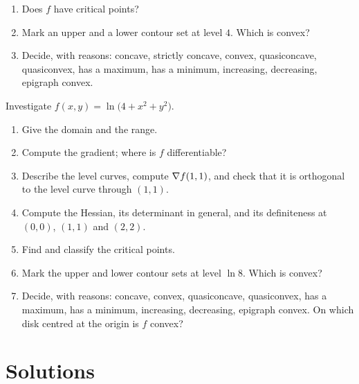 \begin{problems}
\begin{enumerate}[label=(\alph*),leftmargin=1.8em,itemsep=0.2ex]
                orthogonality, interpret direction and norm, and verify
                Euler's theorem at $(1,8)$.
          \item Does $f$ have critical points?
          \item Mark an upper and a lower contour set at level $4$. Which is
                convex?
          \item Decide, with reasons: concave, strictly concave, convex,
                quasiconcave, quasiconvex, has a maximum, has a minimum,
                increasing, decreasing, epigraph convex.
        \end{enumerate}
  \item Investigate $f(x,y)=\ln\bigl(4+x^{2}+y^{2}\bigr)$.
        \begin{enumerate}[label=(\alph*),leftmargin=1.8em,itemsep=0.2ex]
          \item Give the domain and the range.
          \item Compute the gradient; where is $f$ differentiable?
          \item Describe the level curves, compute $\nabla f(1,1)$, and check
                that it is orthogonal to the level curve through $(1,1)$.
          \item Compute the Hessian, its determinant in general, and its
                definiteness at $(0,0)$, $(1,1)$ and $(2,2)$.
          \item Find and classify the critical points.
          \item Mark the upper and lower contour sets at level $\ln8$.
                Which is convex?
          \item Decide, with reasons: concave, convex, quasiconcave,
                quasiconvex, has a maximum, has a minimum, increasing,
                decreasing, epigraph convex. On which disk centred at the
                origin is $f$ convex?
        \end{enumerate}
\end{problems}

\section{Solutions}

